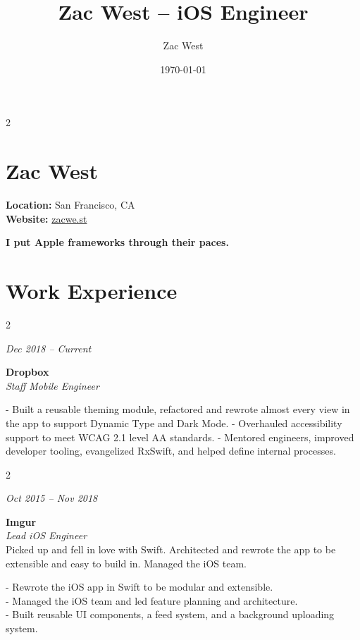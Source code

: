 \documentclass[11pt]{article}
\author{Zac West}
\date{\today}
\title{Zac West -- iOS Engineer}
\begin{document}
\maketitle
\begin{multicols}{2}

\section*{Zac West}
\label{header}
\textbf{Location:} San Francisco, CA\\[0pt]
\textbf{Website:} \href{https://zacwe.st}{zacwe.st}\\[0pt]

\columnbreak

\Large\textbf{I put Apple frameworks through their paces.}

\end{multicols}

\section*{Work Experience}
\label{sec:orga7a5944}

\begin{multicols}{2}

\textit{Dec 2018 -- Current}

\columnbreak
\textbf{Dropbox} \\
\textit{Staff Mobile Engineer}

- Built a reusable theming module, refactored and rewrote almost every view in the app to support Dynamic Type and Dark Mode.
- Overhauled accessibility support to meet WCAG 2.1 level AA standards.
- Mentored engineers, improved developer tooling, evangelized RxSwift, and helped define internal processes.

\end{multicols}

\begin{multicols}{2}

\textit{Oct 2015 -- Nov 2018}

\columnbreak

\textbf{Imgur} \\
\textit{Lead iOS Engineer} \\
Picked up and fell in love with Swift. Architected and rewrote the app to be extensible and easy to build in. Managed the iOS team.

- Rewrote the iOS app in Swift to be modular and extensible. \\
- Managed the iOS team and led feature planning and architecture. \\
- Built reusable UI components, a feed system, and a background uploading system.

\end{multicols}
\end{document}
